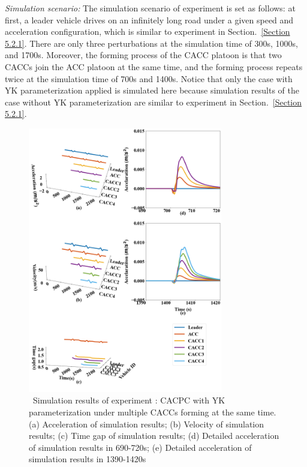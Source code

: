 \documentclass[journal]{IEEEtran}
\begin{document}
\textit{Simulation scenario:} The simulation scenario of experiment \uppercase\expandafter{} is set as follows: at first, a leader vehicle drives on an infinitely long road under a given speed and acceleration configuration, which is similar to experiment \uppercase\expandafter{} in Section.~\ref{Section 5.2.1}. There are only three perturbations at the simulation time of 300s, 1000s, and 1700s. Moreover, the forming process of the CACC platoon is that two CACCs join the ACC platoon at the same time, and the forming process repeats twice at the simulation time of 700s and 1400s. Notice that only the case with YK parameterization applied is simulated here because simulation results of the case without YK parameterization are similar to experiment \uppercase\expandafter{} in Section.~\ref{Section 5.2.1}.

\begin{figure}[htb]
  \centering
  \includegraphics[width=8.5cm]{figs/extendfig7.png}
  \caption{~Simulation results of experiment \uppercase\expandafter{}: CACPC with YK parameterization under multiple CACCs forming at the same time. (a) Acceleration of simulation results; (b) Velocity of simulation results; (c) Time gap of simulation results; (d) Detailed acceleration of simulation results in 690-720s; (e) Detailed acceleration of simulation results in 1390-1420s}
  \label{extend7}
\end{figure}
\end{document}

